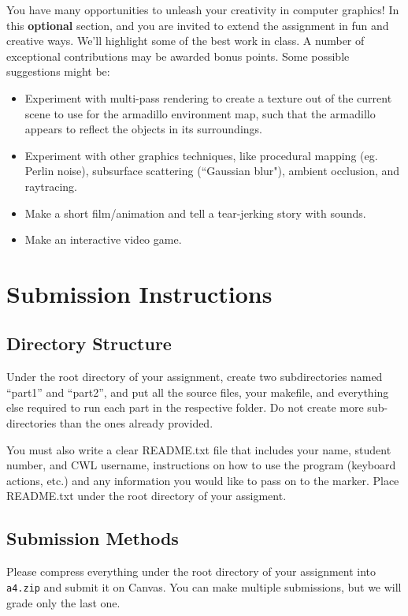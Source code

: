\documentclass[12pt]{exam}
\begin{document}
\begin{enumerate}
You have many opportunities to unleash your creativity in
computer graphics!  In this \textbf{optional} section, and you are
invited to extend the assignment in fun and creative ways.
We'll highlight some of the best work in class. A number of
exceptional contributions may be awarded bonus points.
Some possible suggestions might be:
\begin{itemize}
\item Experiment with multi-pass rendering to create a texture out of the current scene to use for the armadillo environment map, such that the armadillo appears to reflect the objects in its surroundings.
\item Experiment with other graphics techniques, like procedural mapping (eg. Perlin noise), subsurface scattering (``Gaussian blur"), ambient occlusion, and raytracing.
\item Make a short film/animation and tell a tear-jerking story with sounds.
\item Make an interactive video game.
\end{itemize}

\end{enumerate}

\section{Submission Instructions}
\subsection{Directory Structure}
Under the root directory of your assignment, create two subdirectories
named ``part1'' and ``part2'', and put all the source files, your
makefile, and everything else required to run each part in the respective
folder. Do not create more sub-directories than the ones already provided. 

You must also write a clear README.txt file that includes your name,
student number, and CWL username, instructions on how to use the
program (keyboard actions, etc.) and any information you would like to
pass on to the marker. Place README.txt under the root directory of your
assigment.

\subsection{Submission Methods}
Please compress everything under the root directory of your assignment into
{\tt a4.zip} and submit it on Canvas. You can make multiple submissions,
but we will grade only the last one.
\end{document}
